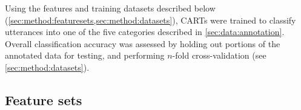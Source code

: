 \documentclass[a4paper]{article}
\newcommand{\TODO}[1]{{\color{red}\textbf{[TODO #1]}}}
\begin{document}

		Using the features and training datasets described below (\cref{sec:method:featuresets,sec:method:datasets}), CARTs were trained to classify utterances into one of the five categories described in \cref{sec:data:annotation}. 
		Overall classification accuracy %
		 was assessed by holding out portions of the annotated data for testing, and performing $n$-fold cross-validation (see \cref{sec:method:datasets}). 
	
	
	    \subsection{Feature sets}
	    \label{sec:method:featuresets}
	    
\end{document}
